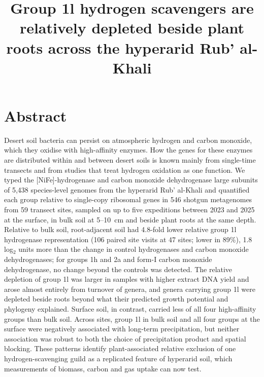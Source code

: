 \documentclass[11pt]{article}
\title{\textbf{Group 1l hydrogen scavengers are relatively depleted beside plant roots across the
hyperarid Rub' al-Khali}}
\date{}
\begin{document}
\maketitle
\linenumbers

\section*{Abstract}
Desert soil bacteria can persist on atmospheric hydrogen and carbon monoxide, which they oxidise with
high-affinity enzymes. How the genes for these enzymes are distributed within and between desert
soils is known mainly from single-time transects and from studies that treat hydrogen oxidation as one
function. We typed the [NiFe]-hydrogenase and carbon monoxide dehydrogenase large subunits of 5{,}438
species-level genomes from the hyperarid Rub' al-Khali and quantified each group relative to single-copy
ribosomal genes in 546 shotgun metagenomes from 59 transect sites, sampled on up to five expeditions between
2023 and 2025 at the surface, in bulk soil at 5--10~cm and beside plant roots at the same depth.
Relative to bulk soil, root-adjacent soil had 4.8-fold lower relative group 1l hydrogenase representation
(106 paired site visits at 47 sites; lower in 89\%), 1.8 log$_2$ units more than the change in control
hydrogenases and carbon monoxide dehydrogenases; for groups 1h and 2a and form-I carbon monoxide
dehydrogenase, no change beyond the controls was detected. The relative depletion of group 1l was
larger in samples with higher extract DNA yield and arose almost entirely from turnover of genera, and
genera carrying group 1l were depleted beside roots beyond what their predicted growth potential and
phylogeny explained. Surface soil, in contrast, carried less of all four high-affinity groups than bulk
soil. Across sites, group 1l in bulk soil and all four groups at the surface were negatively associated
with long-term precipitation, but neither association was robust to both the choice of precipitation
product and spatial blocking. These patterns identify plant-associated relative exclusion of one
hydrogen-scavenging guild as a replicated feature of hyperarid soil, which measurements of biomass,
carbon and gas uptake can now test.

\end{document}
